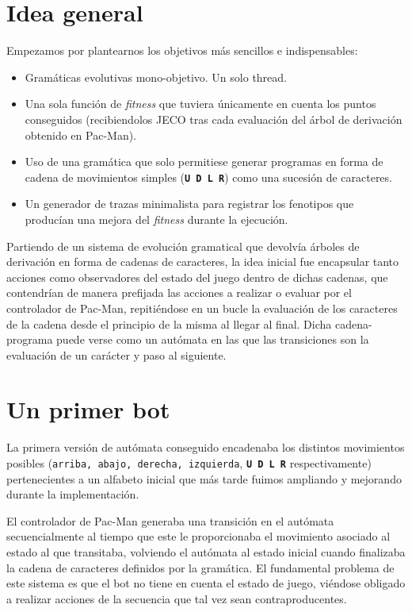 \section{Idea general}
Empezamos por plantearnos los objetivos más sencillos e indispensables:
\begin{itemize}
\item Gramáticas evolutivas mono-objetivo.
Un solo thread.

\item Una sola función de \textit{fitness} que tuviera únicamente en cuenta los puntos conseguidos (recibiendolos JECO tras cada evaluación del árbol de derivación obtenido en Pac-Man).

\item Uso de una gramática que solo permitiese generar programas en forma de cadena de movimientos simples (\textbf{\texttt{U D L R}}) como una sucesión de caracteres.

\item Un generador de trazas minimalista para registrar los fenotipos que producían una mejora del \textit{fitness} durante la ejecución.
\end{itemize}

Partiendo de un sistema de evolución gramatical que devolvía árboles de derivación en forma de cadenas de caracteres, la idea inicial fue encapsular tanto acciones como observadores del estado del juego dentro de dichas cadenas, que contendrían de manera prefijada las acciones a realizar o evaluar por el controlador de Pac-Man, repitiéndose en un bucle la evaluación de los caracteres de la cadena desde el principio de la misma al llegar al final. Dicha cadena-programa puede verse como un autómata en las que las transiciones son la evaluación de un carácter y paso al siguiente.

\section{Un primer bot}
La primera versión de autómata conseguido encadenaba los distintos movimientos posibles (\texttt{arriba, abajo, derecha, izquierda}, \textbf{\texttt{U D L R}} respectivamente) pertenecientes a un alfabeto inicial que más tarde fuimos ampliando y mejorando durante la implementación.
 
El controlador de Pac-Man generaba una transición en el autómata secuencialmente al tiempo que este le proporcionaba el movimiento asociado al estado al que transitaba, volviendo el autómata al estado inicial cuando finalizaba la cadena de caracteres definidos por la gramática. El fundamental problema de este sistema es que el bot no tiene en cuenta el estado de juego, viéndose obligado a realizar acciones de la secuencia que tal vez sean contraproducentes.
 
